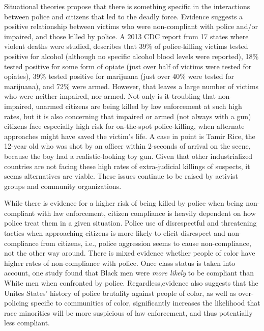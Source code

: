 \documentclass[sigconf]{acmart}
\begin{document}
Situational theories propose that there is something specific in the interactions between police and citizens that led to the deadly force.  Evidence suggests a positive relationship between victims who were non-compliant with police and/or impaired, and those killed by police. \cite{nix17}  A 2013 CDC report from 17 states where violent deaths were studied, describes that 39\% of police-killing victims tested positive for alcohol (although no specific alcohol blood levels were reported), 18\% tested positive for some form of opiate (just over half of victims were tested for opiates), 39\% tested positive for marijuana (just over 40\% were tested for marijuana), and 72\% were armed. \cite{cdc13}  However, that leaves a large number of victims who were neither impaired, nor armed.  Not only is it troubling that non-impaired, unarmed citizens are being killed by law enforcement at such high rates, but it is also concerning that impaired or armed (not always with a gun) citizens face especially high risk for on-the-spot police-killing, when alternate approaches might have saved the victim's life.  A case in point is Tamir Rice, the 12-year old who was shot by an officer within 2-seconds of arrival on the scene, because the boy had a realistic-looking toy gun. \cite{nix17}  Given that other industrialized countries are not facing these high rates of extra-judicial killings of suspects, it seems alternatives are viable.  These issues continue to be raised by activist groups and community organizations.    

While there is evidence for a higher risk of being killed by police when being non-compliant with law enforcement, citizen compliance is heavily dependent on how police treat them in a given situation. \cite{nix17,brunson05} Police use of disrespectful and threatening tactics when approaching citizens is more likely to elicit disrespect and non-compliance from citizens, i.e., police aggression seems to cause non-compliance, not the other way around. \cite{mast96,dai11,sharp07,mcluskey99}  There is mixed evidence whether people of color have higher rates of non-compliance with police.  Once class status is taken into account, one study found that Black men were {\em more likely} to be compliant than White men when confronted by police. \cite{mast96}  Regardless,evidence also suggests that the Unites States' history of police brutality against people of color, as well as over-policing specific to communities of color, significantly increases the likelihood that race minorities will be more suspicious of law enforcement, and thus potentially less compliant. \cite{payne17,kent05,meehan02,sharp07,brunson06} 
\end{document}
